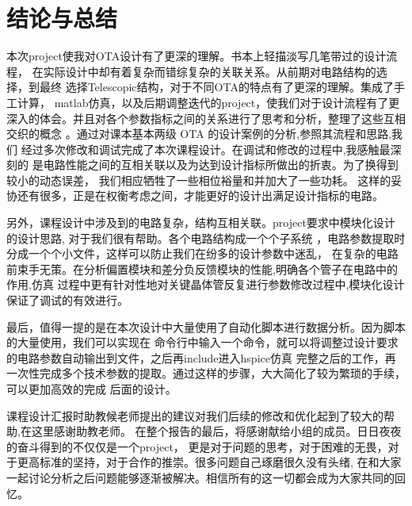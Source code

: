 \documentclass[a4paper]{article}
\begin{document}
\section{结论与总结}
本次project使我对OTA设计有了更深的理解。书本上轻描淡写几笔带过的设计流程，
在实际设计中却有着复杂而错综复杂的关联关系。从前期对电路结构的选择，到最终
选择Telescopic结构，对于不同OTA的特点有了更深的理解。集成了手工计算，
matlab仿真，以及后期调整迭代的project，使我们对于设计流程有了更
深入的体会。并且对各个参数指标之间的关系进行了思考和分析，整理了这些互相交织的概念
。通过对课本基本两级 OTA 的设计案例的分析,参照其流程和思路,我们
经过多次修改和调试完成了本次课程设计。在调试和修改的过程中,我感触最深刻的
是电路性能之间的互相关联以及为达到设计指标所做出的折衷。为了换得到较小的动态误差，
我们相应牺牲了一些相位裕量和并加大了一些功耗。
这样的妥协还有很多，正是在权衡考虑之间，才能更好的设计出满足设计指标的电路。

另外，课程设计中涉及到的电路复杂，结构互相关联。project要求中模块化设计的设计思路,
对于我们很有帮助。各个电路结构成一个个子系统
，电路参数提取时分成一个个小文件，这样可以防止我们在纷多的设计参数中迷乱，
在复杂的电路前束手无策。在分析偏置模块和差分负反馈模块的性能,明确各个管子在电路中的作用,仿真
过程中更有针对性地对关键晶体管反复进行参数修改过程中,模块化设计保证了调试的有效进行。

最后，值得一提的是在本次设计中大量使用了自动化脚本进行数据分析。因为脚本的大量使用，我们可以实现在
命令行中输入一个命令，就可以将调整过设计要求的电路参数自动输出到文件，之后再include进入hspice仿真
完整之后的工作，再一次性完成多个技术参数的提取。通过这样的步骤，大大简化了较为繁琐的手续，可以更加高效的完成
后面的设计。

课程设计汇报时助教候老师提出的建议对我们后续的修改和优化起到了较大的帮助,在这里感谢助教老师。
在整个报告的最后，将感谢献给小组的成员。日日夜夜的奋斗得到的不仅仅是一个project，
更是对于问题的思考，对于困难的无畏，对于更高标准的坚持，对于合作的推崇。很多问题自己琢磨很久没有头绪,
在和大家一起讨论分析之后问题能够逐渐被解决。相信所有的这一切都会成为大家共同的回忆。
\end{document}

